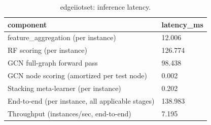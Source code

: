 \begin{table}[t]
\centering
\caption{edgeiiotset: inference latency.}
\label{tab:edgeiiotset_inference_latency}
\begin{tabular}{ll}
\toprule
component & latency\_ms \\
\midrule
feature\_aggregation (per instance) & 12.006 \\
RF scoring (per instance) & 126.774 \\
GCN full-graph forward pass & 98.438 \\
GCN node scoring (amortized per test node) & 0.002 \\
Stacking meta-learner (per instance) & 0.202 \\
End-to-end (per instance, all applicable stages) & 138.983 \\
Throughput (instances/sec, end-to-end) & 7.195 \\
\bottomrule
\end{tabular}
\end{table}
